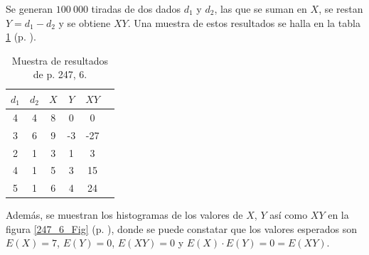 \documentclass[paper=leter, fontsize=11pt]{scrartcl}
\begin{document}
Se generan $100\ 000$ tiradas de dos dados $d_1$ y $d_2$, las que se suman en $X$, se restan $Y = d_1 - d_2$ y se obtiene $XY$. Una muestra de estos resultados se halla en la tabla \ref{247_6} (p. \pageref{247_6}). 

\begin{table}
    \centering
    \caption{Muestra de resultados de p. 247, 6.}
    \label{247_6}
    \begin{tabular}{cccccc}
      \hline
        $d_1$ & $d_2$ & $X$ & $Y$ & $XY$ \\ 
      \hline
        4 &   4 &   8 &   0 &   0 \\ 
        3 &   6 &   9 &  -3 & -27 \\ 
        2 &   1 &   3 &   1 &   3 \\ 
        4 &   1 &   5 &   3 &  15 \\ 
        5 &   1 &   6 &   4 &  24 \\ 
       \hline
    \end{tabular}
\end{table}

Además, se muestran los histogramas de los valores de $X$, $Y$ así como $XY$ en la figura \ref{247_6_Fig} (p. \pageref{247_6_Fig}), donde se puede constatar que los valores esperados son $E(X) = 7$, $E(Y) = 0$, $E(XY) = 0$ y $E(X) \cdot E(Y) = 0 = E(XY)$.
\end{document}
